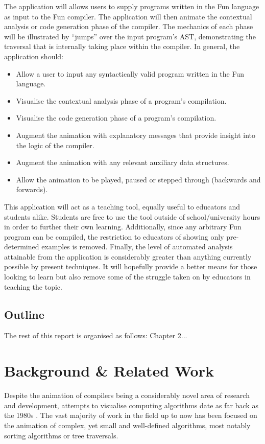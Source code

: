 \documentclass{l4proj}
\begin{document}
The application will allows users to supply programs written in the Fun language as input to the Fun compiler. The application will then animate the contextual analysis or code generation phase of the compiler. The mechanics of each phase will be illustrated by ``jumps'' over the input program's AST, demonstrating the traversal that is internally taking place within the compiler. In general, the application should:
\begin{itemize}
\item Allow a user to input any syntactically valid program written in the Fun language.
\item Visualise the contextual analysis phase of a program's compilation. 
\item Visualise the code generation phase of a program's compilation.
\item Augment the animation with explanatory messages that provide insight into the logic of the compiler.
\item Augment the animation with any relevant auxiliary data structures.
\item Allow the animation to be played, paused or stepped through (backwards and forwards).
\end{itemize}

This application will act as a teaching tool, equally useful to educators and students alike. Students are free to use the tool outside of school/university hours in order to further their own learning. Additionally, since any arbitrary Fun program can be compiled, the restriction to educators of showing only pre-determined examples is removed. Finally, the level of automated analysis attainable from the application is considerably greater than anything currently possible by present techniques. It will hopefully provide a better means for those looking to learn but also remove some of the struggle taken on by educators in teaching the topic.

\section{Outline}
The rest of this report is organised as follows: Chapter 2...

\chapter{Background \& Related Work}
Despite the animation of compilers being a considerably novel area of research and development, attempts to visualise computing algorithms date as far back as the 1980s \cite{BentleyKernighan}. The vast majority of work in the field up to now has been focused on the animation of complex, yet small and well-defined algorithms, most notably sorting algorithms or tree traversals.
\end{document}
